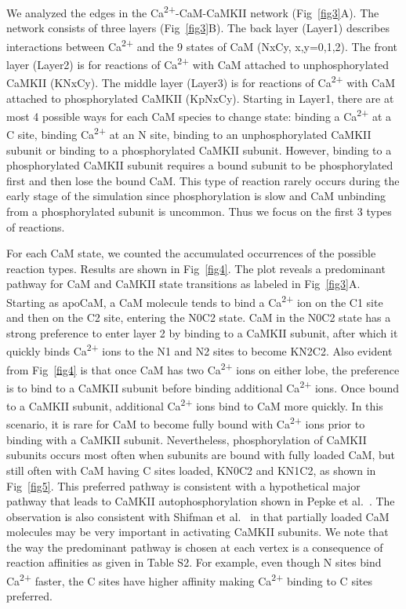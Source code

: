 \documentclass[10pt,letterpaper]{article}
\begin{document}
We analyzed the edges in the Ca\textsuperscript{2+}-CaM-CaMKII network (Fig~\ref{fig3}A). The network consists of three layers (Fig~\ref{fig3}B). The back layer (Layer1) describes interactions between Ca\textsuperscript{2+} and the 9 states of CaM (NxCy, x,y=0,1,2). The front layer (Layer2) is for reactions of Ca\textsuperscript{2+} with CaM attached to unphosphorylated CaMKII (KNxCy). The middle layer (Layer3) is for reactions of Ca\textsuperscript{2+} with CaM attached to phosphorylated CaMKII (KpNxCy). Starting in Layer1, there are at most 4 possible ways for each CaM species to change state: binding a Ca\textsuperscript{2+} at a C site, binding Ca\textsuperscript{2+} at an N site, binding to an unphosphorylated CaMKII subunit or binding to a phosphorylated CaMKII subunit. However, binding to a phosphorylated CaMKII subunit requires a bound subunit to be phosphorylated first and then lose the bound CaM. This type of reaction rarely occurs during the early stage of the simulation since phosphorylation is slow and CaM unbinding from a phosphorylated subunit is uncommon. Thus we focus on the first 3 types of reactions.

For each CaM state, we counted the accumulated occurrences of the possible reaction types. Results are shown in Fig~\ref{fig4}. The plot reveals a predominant pathway for CaM and CaMKII state transitions as labeled in Fig~\ref{fig3}A. Starting as apoCaM, a CaM molecule tends to bind a Ca\textsuperscript{2+} ion on the C1 site and then on the C2 site, entering the N0C2 state. CaM in the N0C2 state has a strong preference to enter layer 2 by binding to a CaMKII subunit, after which it quickly binds Ca\textsuperscript{2+} ions to the N1 and N2 sites to become KN2C2. Also evident from Fig~\ref{fig4} is that once CaM has two Ca\textsuperscript{2+} ions on either lobe, the preference is to bind to a CaMKII subunit before binding additional Ca\textsuperscript{2+} ions. Once bound to a CaMKII subunit, additional Ca\textsuperscript{2+} ions bind to CaM more quickly. In this scenario, it is rare for CaM to become fully bound with Ca\textsuperscript{2+} ions prior to binding with a CaMKII subunit. Nevertheless, phosphorylation of CaMKII subunits occurs most often when subunits are bound with fully loaded CaM, but still often with CaM having C sites loaded, KN0C2 and KN1C2, as shown in Fig~\ref{fig5}. This preferred pathway is consistent with a hypothetical major pathway that leads to CaMKII autophosphorylation shown in Pepke et al.~\cite{Pepke:2010ju}. The observation is also consistent with Shifman et al.~\cite{Shifman:2006hw} in that partially loaded CaM molecules may be very important in activating CaMKII subunits. We note that the way the predominant pathway is chosen at each vertex is a consequence of reaction affinities as given in Table S2. For example, even though N sites bind Ca\textsuperscript{2+} faster, the C sites have higher affinity making Ca\textsuperscript{2+} binding to C sites preferred. 
\end{document}
